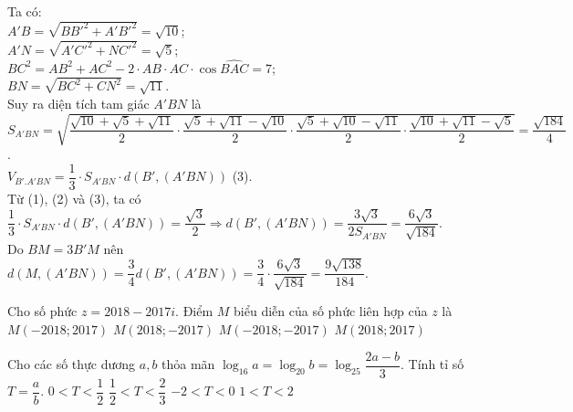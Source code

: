 \begin{ex}
{Ta có:\\
$A'B=\sqrt{BB'^2+A'B'^2}=\sqrt{10}$;\\
$A'N=\sqrt{A'C'^2+NC'^2}=\sqrt{5}$;\\
$BC^2=AB^2+AC^2-2\cdot AB\cdot AC\cdot \cos \widehat{BAC}=7$;\\
$BN=\sqrt{BC^2+CN^2}=\sqrt{11}$.\\
Suy ra diện tích tam giác $A'BN$ là\\
$S_{A'BN}=\sqrt{\dfrac{\sqrt{10}+\sqrt{5}+\sqrt{11}}{2}\cdot\dfrac{\sqrt{5}+\sqrt{11}-\sqrt{10}}{2}\cdot\dfrac{\sqrt{5}+\sqrt{10}-\sqrt{11}}{2}\cdot\dfrac{\sqrt{10}+\sqrt{11}-\sqrt{5}}{2}}=\dfrac{\sqrt{184}}{4}$.\\
$V_{B'.A'BN}=\dfrac{1}{3}\cdot S_{A'BN}\cdot d(B',(A'BN))$ (3).\\
Từ (1), (2) và (3), ta có $\dfrac{1}{3}\cdot S_{A'BN}\cdot d(B',(A'BN))=\dfrac{\sqrt{3}}{2}\Rightarrow d(B',(A'BN))=\dfrac{3\sqrt{3}}{2S_{A'BN}}=\dfrac{6\sqrt{3}}{\sqrt{184}}$.\\
Do $BM=3B'M$ nên $d(M,(A'BN))=\dfrac{3}{4}d(B',(A'BN))=\dfrac{3}{4}\cdot\dfrac{6\sqrt{3}}{\sqrt{184}}=\dfrac{9\sqrt{138}}{184}$.
}
\end{ex}

\begin{ex}%
Cho số phức $z=2018-2017i$. Điểm $M$ biểu diễn của số phức liên hợp của $z$ là
\choice
{$M(-2018;2017)$}
{$M(2018;-2017)$}
{$M(-2018;-2017)$}
{\True $M(2018;2017)$}
\end{ex}

\begin{ex}%
Cho các số thực dương $a,b$ thỏa mãn $\log_{16}a=\log_{20}b=\log_{25}\dfrac{2a-b}{3}$. Tính tỉ số $T=\dfrac{a}{b}$.
\choice
{$0<T<\dfrac{1}{2}$}
{$\dfrac{1}{2}<T<\dfrac{2}{3}$}
{$-2<T<0$}
{\True $1<T<2$}
\end{ex}

